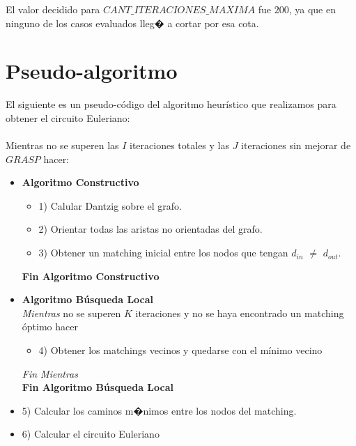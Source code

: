 \documentclass[11pt, a4paper, spanish]{article}
\begin{document}
El valor decidido para $CANT\_ITERACIONES\_MAXIMA$ fue $200$, ya que en ninguno de los casos evaluados lleg� a cortar por esa cota.\\
\newpage
\section{Pseudo-algoritmo}

El siguiente es un pseudo-c\'odigo del algoritmo heur\'istico que realizamos para obtener el circuito Euleriano:\\

\\
Mientras no se superen las $I$ iteraciones totales y las $J$ iteraciones sin mejorar de $GRASP$ hacer:

\begin{itemize}
	\item \textbf{Algoritmo Constructivo}
		\begin{itemize}
			\item 1) Calular Dantzig sobre el grafo.
			\item 2) Orientar todas las aristas no orientadas del grafo.
			\item 3) Obtener un matching inicial entre los nodos que tengan $d_{in}$ $\neq$ $d_{out}$.
		\end{itemize}
	\textbf{Fin Algoritmo Constructivo}

	\item \textbf{Algoritmo B\'usqueda Local}\\
	\emph{Mientras} no se superen $K$ iteraciones y no se haya encontrado un matching \'optimo hacer
	\begin{itemize}
		\item 4) Obtener los matchings vecinos y quedarse con el m\'inimo vecino
	\end{itemize}
	\emph{Fin Mientras}\\
	\textbf{Fin Algoritmo B\'usqueda Local}

	\item 5) Calcular los caminos m�nimos entre los nodos del matching.
	\item 6) Calcular el circuito Euleriano\\


\end{itemize}


\newpage
\end{document}
